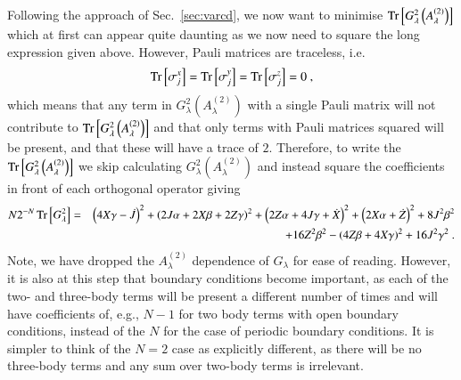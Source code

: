 Following the approach of Sec.~\ref{sec:varcd}, we now want to minimise $\Tr\left[G_\lambda^2\left(A_\lambda^{(2)}\right) \right]$ which at first can appear quite daunting as we now need to square the long expression given above. However, Pauli matrices are traceless, i.e.
\begin{equation}
    \Tr\left[\sigma_j^x\right] = \Tr\left[\sigma_j^y\right] = \Tr\left[\sigma_j^z\right] = 0 \nonumber \ ,
\end{equation}
which means that any term in $G_\lambda^2\left(A_\lambda^{(2)}\right)$ with a single Pauli matrix will not contribute to $\Tr\left[G_\lambda^2\left(A_\lambda^{(2)}\right)\right]$ and that only terms with Pauli matrices squared will be present, and that these will have a trace of $2$. Therefore, to write the $\Tr\left[G_\lambda^2\left(A_\lambda^{(2)}\right)\right]$ we skip calculating $G_\lambda^2\left(A_\lambda^{(2)}\right)$ and instead square the coefficients in front of each orthogonal operator giving
\begin{eqnarray}
   N 2^{-N} \Tr\left[G_\lambda^2\right] & = & \left(4 X \gamma - \dot{J}\right)^2 + \left( 2J\alpha + 2X\beta + 2Z\gamma \right)^2 + \left( 2Z\alpha + 4J\gamma + \dot{X} \right)^2 + \left( 2X\alpha + \dot{Z} \right)^2 + 8J^2\beta^2 \nonumber \\ & & + 16Z^2 \beta^2 - \left( 4Z \beta + 4X \gamma \right)^2 + 16J^2 \gamma^2 \ .
\end{eqnarray}
Note, we have dropped the $A_\lambda^{(2)}$ dependence of $G_\lambda$ for ease of reading. However, it is also at this step that boundary conditions become important, as each of the two- and three-body terms will be present a different number of times and will have coefficients of, e.g., $N-1$ for two body terms with open boundary conditions, instead of the $N$ for the case of periodic boundary conditions. It is simpler to think of the $N=2$ case as explicitly different, as there will be no three-body terms and any sum over two-body terms is irrelevant.

